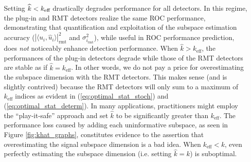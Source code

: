 Setting $\widehat{k} < k_\text{eff}$ drastically degrades performance for all detectors. In this regime, the plug-in and RMT detectors realize the same ROC performance, demonstrating that quantification and exploitation of the subspace estimation accuracy ($|\langle u_i,\widehat{u}_i\rangle |^2_{\text{rmt}}$ and $\sigma_{i_\text{rmt}}^2$), while useful in ROC performance prediction, does \textit{not} noticeably enhance detection performance. When $\widehat{k} > k_\text{eff}$, the performances of the plug-in detectors degrade while those of the RMT detectors are stable as if $\widehat{k}=k_\text{eff}$. In other words, we do not pay a price for overestimating the subspace dimension with the RMT detectors. This makes sense (and is slightly contrived) because the RMT detectors will only sum to a maximum of $k_\text{eff}$ indices as evident in (\ref{eq:optimal_stat_stoch}) and (\ref{eq:optimal_stat_determ}). In many applications, practitioners might employ the ``play-it-safe'' approach and set $\widehat{k}$ to be significantly greater than $k_\text{eff}$. The performance loss caused by adding each uninformative subspace, as seen in Figure \ref{fig:khat_graphs}, constitutes evidence to the assertion that overestimating the signal subspace dimension is a bad idea. When $k_\text{eff} < k$, even perfectly estimating the subspace dimension (i.e. setting $\widehat{k} = k$) is suboptimal.
